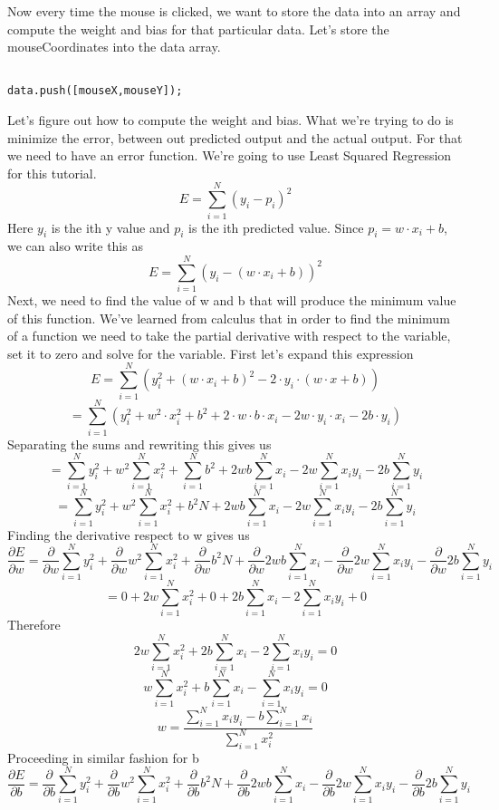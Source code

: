 \documentclass{article}
\begin{document}
Now every time the mouse is clicked, we want to store the data into an array and compute the weight and bias for that particular data. Let's store the mouseCoordinates into the data array.
\begin{verbatim}

data.push([mouseX,mouseY]);
\end{verbatim}

Let's figure out how to compute the weight and bias. What we're trying to do is minimize the error, between out predicted output and the actual output. For that we need to have an error function. We're going to use Least Squared Regression for this tutorial.
\[E = \sum_{i=1}^{N}(y_{i} - p_{i})^2\]
Here \(y_{i}\) is the ith y value and \(p_{i}\) is the ith predicted value. Since \(p_{i} = w\cdot{}x_{i} + b\), we can also write this as
\[E = \sum_{i=1}^{N}(y_{i} - (w\cdot{}x_{i} + b))^2\]
Next, we need to find the value of w and b that will produce the minimum value of this function. We've learned from calculus that in order to find the minimum of a function we need to take the partial derivative with respect to the variable, set it to zero and solve for the variable.
First let's expand this expression
\[E = \sum_{i=1}^{N}(y_{i}^2 + (w\cdot{}x_{i} + b)^2 - 2\cdot{}y_{i}\cdot{}(w\cdot{x}+b))\]
\[= \sum_{i=1}^{N}(y_{i}^2 + w^2\cdot{}x_{i}^2 + b^2+2\cdot{}w\cdot{b}\cdot{}x_{i} - 2w\cdot{}y_{i}\cdot{x_{i}}-2b\cdot{}y_{i})\]
Separating the sums and rewriting this gives us
\[ = \sum_{i=1}^{N}y_{i}^2+w^2\sum_{i=1}^{N}x_{i}^2+\sum_{i=1}^{N}b^2+2wb\sum_{i=1}^{N}x_{i}-2w\sum_{i=1}^{N}x_{i}y_{i}-2b\sum_{i=1}^{N}y_{i}\]
\[ = \sum_{i=1}^{N}y_{i}^2+w^2\sum_{i=1}^{N}x_{i}^2+b^2N+2wb\sum_{i=1}^{N}x_{i}-2w\sum_{i=1}^{N}x_{i}y_{i}-2b\sum_{i=1}^{N}y_{i}\]
Finding the derivative respect to w gives us
\[\frac{\partial E}{\partial w} = \frac{\partial }{\partial w}\sum_{i=1}^{N}y_{i}^2+\frac{\partial }{\partial w}w^2\sum_{i=1}^{N}x_{i}^2+\frac{\partial }{\partial w}b^2N+\frac{\partial }{\partial w}2wb\sum_{i=1}^{N}x_{i}-\frac{\partial }{\partial w}2w\sum_{i=1}^{N}x_{i}y_{i}-\frac{\partial }{\partial w}2b\sum_{i=1}^{N}y_{i} \]
\[ = 0+2w\sum_{i=1}^{N}x_{i}^2+0+2b\sum_{i=1}^{N}x_{i}-2\sum_{i=1}^{N}x_{i}y_{i}+0\]
Therefore
\[2w\sum_{i=1}^{N}x_{i}^2+2b\sum_{i=1}^{N}x_{i}-2\sum_{i=1}^{N}x_{i}y_{i} = 0\]
\[w\sum_{i=1}^{N}x_{i}^2+b\sum_{i=1}^{N}x_{i}-\sum_{i=1}^{N}x_{i}y_{i} = 0\]
\[w =\frac{ \sum_{i=1}^{N}x_{i}y_{i} - b\sum_{i=1}^{N}x_{i}}{\sum_{i=1}^{N}x_{i}^2}\]
Proceeding in similar fashion for b
\[\frac{\partial E}{\partial b} = \frac{\partial }{\partial b}\sum_{i=1}^{N}y_{i}^2+\frac{\partial }{\partial b}w^2\sum_{i=1}^{N}x_{i}^2+\frac{\partial }{\partial b}b^2N+\frac{\partial }{\partial b}2wb\sum_{i=1}^{N}x_{i}-\frac{\partial }{\partial b}2w\sum_{i=1}^{N}x_{i}y_{i}-\frac{\partial }{\partial b}2b\sum_{i=1}^{N}y_{i} \]
\end{document}
